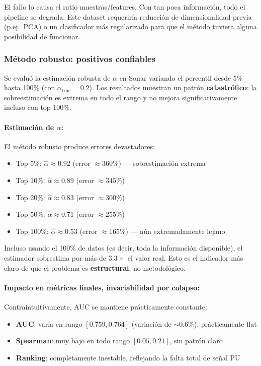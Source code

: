 \documentclass[a4paper,11pt]{article}
\begin{document}
El fallo lo causa el ratio muestras/features. Con tan poca información, todo el pipeline se degrada. Este dataset requeriría reducción de dimensionalidad previa (p.ej.\ PCA) o un clasificador más regularizado para que el método tuviera alguna posibilidad de funcionar.

\subsubsection{Método robusto: positivos confiables}

Se evaluó la estimación robusta de $\alpha$ en Sonar variando el percentil desde 5\% hasta 100\% (con $\alpha_{\text{true}}=0.2$). Los resultados muestran un patrón \textbf{catastrófico}: la sobreestimación es extrema en todo el rango y no mejora significativamente incluso con top 100\%.

\paragraph{Estimación de $\alpha$:} El método robusto produce errores devastadores:
\begin{itemize}
    \item Top 5\%: $\hat{\alpha} \approx 0.92$ (error $\approx 360\%$) — sobrestimación extrema
    \item Top 10\%: $\hat{\alpha} \approx 0.89$ (error $\approx 345\%$)
    \item Top 20\%: $\hat{\alpha} \approx 0.83$ (error $\approx 300\%$)
    \item Top 50\%: $\hat{\alpha} \approx 0.71$ (error $\approx 255\%$)
    \item Top 100\%: $\hat{\alpha} \approx 0.53$ (error $\approx 165\%$) — aún extremadamente lejano
\end{itemize}

Incluso usando el 100\% de datos (es decir, toda la información disponible), el estimador sobrestima por más de $3.3\times$ el valor real. Esto es el indicador más claro de que el problema es \textbf{estructural}, no metodológico.

\paragraph{Impacto en métricas finales, invariabilidad por colapso:} Contraintuitivamente, AUC se mantiene prácticamente constante:

\begin{itemize}
    \item \textbf{AUC}: varía en rango $[0.759, 0.764]$ (variación de $\sim 0.6\%$), prácticamente flat
    \item \textbf{Spearman}: muy bajo en todo rango $[0.05, 0.21]$, sin patrón claro
    \item \textbf{Ranking}: completamente inestable, reflejando la falta total de señal PU
\end{itemize}
\end{document}
